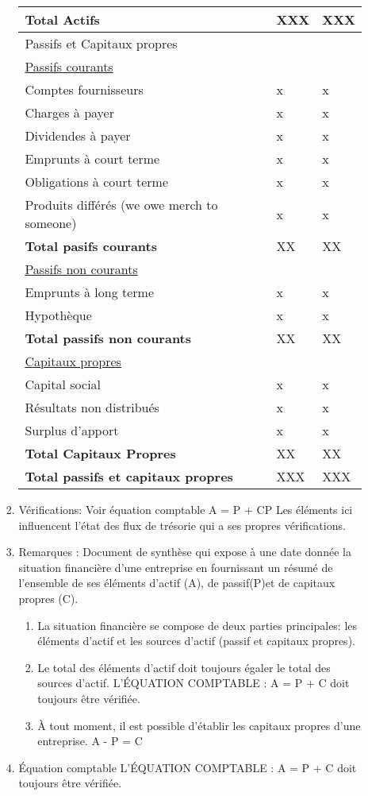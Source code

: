 \documentclass[11pt]{article}
\begin{document}
\begin{enumerate}
\begin{enumerate}
\begin{enumerate}
\begin{center}
\begin{tabular}{lll}
\hline
\textbf{Total Actifs} & XXX & XXX\\
\hline
Passifs et Capitaux propres &  & \\
\hline
\uline{Passifs courants} &  & \\
Comptes fournisseurs & x & x\\
Charges à payer & x & x\\
Dividendes à payer & x & x\\
Emprunts à court terme & x & x\\
Obligations à court terme & x & x\\
Produits différés (we owe merch to someone) & x & x\\
\textbf{Total pasifs courants} & XX & XX\\
\hline
\uline{Passifs non courants} &  & \\
Emprunts à long terme & x & x\\
Hypothèque & x & x\\
\textbf{Total passifs non courants} & XX & XX\\
\hline
\uline{Capitaux propres} &  & \\
Capital social & x & x\\
Résultats non distribués & x & x\\
Surplus d'apport & x & x\\
\textbf{Total Capitaux Propres} & XX & XX\\
\hline
\textbf{Total passifs et capitaux propres} & XXX & XXX\\
\hline
\end{tabular}
\end{center}
\item Vérifications:
\label{sec:org56b8572}
Voir équation comptable A = P + CP
Les éléments ici influencent l'état des flux de trésorie qui a ses propres vérifications.
\item Remarques :
\label{sec:orge7999b9}
Document de synthèse qui expose à une date donnée la situation financière d'une
entreprise en fournissant un résumé de l'ensemble de ses éléments d'actif (A),
de passif(P)et de capitaux propres (C).

\begin{enumerate}
\item La situation financière se compose de deux parties principales: les
éléments d'actif et les sources d'actif (passif et capitaux propres).
\item Le total des éléments d'actif doit toujours égaler le total des sources
d'actif.
L'ÉQUATION COMPTABLE : A = P + C doit toujours être vérifiée.
\item À tout moment, il est possible d'établir les capitaux propres d'une
entreprise.
A - P = C
\end{enumerate}
\item Équation comptable
\label{sec:orgeb0fc68}
L'ÉQUATION COMPTABLE : A = P + C doit toujours être vérifiée.
\end{enumerate}


\end{enumerate}
\end{enumerate}
\end{document}

